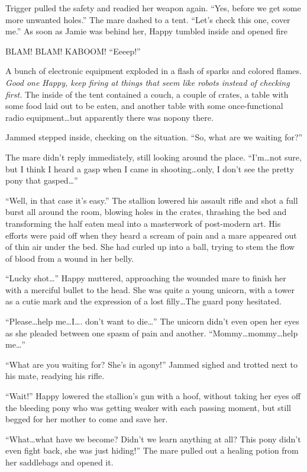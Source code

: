 Trigger pulled the safety and readied her weapon again. ``Yes, before we get some more unwanted holes.'' The mare dashed to a tent. ``Let's check this one, cover me.'' As soon as Jamie was behind her, Happy tumbled inside and opened fire

BLAM! BLAM! KABOOM! ``Eeeep!''

A bunch of electronic equipment exploded in a flash of sparks and colored flames. \emph{Good one Happy, keep firing at things that seem like robots instead of checking first.} The inside of the tent contained a couch, a couple of crates, a table with some food laid out to be eaten, and another table with some once-functional radio equipment\dots but apparently there was nopony there.

Jammed stepped inside, checking on the situation. ``So, what are we waiting for?''

The mare didn't reply immediately, still looking around the place. ``I'm\dots not sure, but I think I heard a gasp when I came in shooting\dots only, I don't see the pretty pony that gasped\dots''

``Well, in that case it's easy.'' The stallion lowered his assault rifle and shot a full burst all around the room, blowing holes in the crates, thrashing the bed and transforming the half eaten meal into a masterwork of post-modern art. His efforts were paid off when they heard a scream of pain and a mare appeared out of thin air under the bed. She had curled up into a ball, trying to stem the flow of blood from a wound in her belly.

``Lucky shot\dots'' Happy muttered, approaching the wounded mare to finish her with a merciful bullet to the head. She was quite a young unicorn, with a tower as a cutie mark and the expression of a lost filly\dots The guard pony hesitated.

``Please\dots help me\dots I\dots. don't want to die\dots'' The unicorn didn't even open her eyes as she pleaded between one spasm of pain and another. ``Mommy\dots mommy\dots help me\dots''

``What are you waiting for? She's in agony!'' Jammed sighed and trotted next to his mate, readying his rifle.

``Wait!'' Happy lowered the stallion's gun with a hoof, without taking her eyes off the bleeding pony who was getting weaker with each passing moment, but still begged for her mother to come and save her.

``What\dots what have we become? Didn't we learn anything at all? This pony didn't even fight back, she was just hiding!'' The mare pulled out a healing potion from her saddlebags and opened it.

